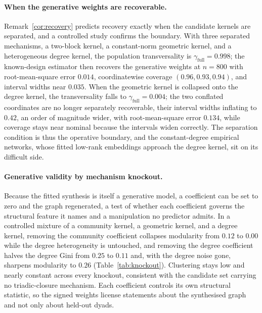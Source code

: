 \documentclass[12pt]{article}
\newcommand{\1}{\mathbf{1}}
\begin{document}
\paragraph{When the generative weights are recoverable.} Remark~\ref{cor:recovery} predicts recovery exactly when the candidate kernels are separated, and a controlled study confirms the boundary. With three separated mechanisms, a two-block kernel, a constant-norm geometric kernel, and a heterogeneous degree kernel, the population transversality is $\gamma_{\mathrm{full}}=0.998$; the known-design estimator then recovers the generative weights at $n=800$ with root-mean-square error $0.014$, coordinatewise coverage $(0.96,0.93,0.94)$, and interval widths near $0.035$. When the geometric kernel is collapsed onto the degree kernel, the transversality falls to $\gamma_{\mathrm{full}}=0.004$; the two conflated coordinates are no longer separately recoverable, their interval widths inflating to $0.42$, an order of magnitude wider, with root-mean-square error $0.134$, while coverage stays near nominal because the intervals widen correctly. The separation condition is thus the operative boundary, and the constant-degree empirical networks, whose fitted low-rank embeddings approach the degree kernel, sit on its difficult side.

\paragraph{Generative validity by mechanism knockout.} Because the fitted synthesis is itself a generative model, a coefficient can be set to zero and the graph regenerated, a test of whether each coefficient governs the structural feature it names and a manipulation no predictor admits. In a controlled mixture of a community kernel, a geometric kernel, and a degree kernel, removing the community coefficient collapses modularity from $0.12$ to $0.00$ while the degree heterogeneity is untouched, and removing the degree coefficient halves the degree Gini from $0.25$ to $0.11$ and, with the degree noise gone, sharpens modularity to $0.26$ (Table~\ref{tab:knockout}). Clustering stays low and nearly constant across every knockout, consistent with the candidate set carrying no triadic-closure mechanism. Each coefficient controls its own structural statistic, so the signed weights license statements about the synthesised graph and not only about held-out dyads.
\end{document}
